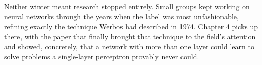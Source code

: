 Neither winter meant research stopped entirely. Small groups kept working on neural networks through the years when the label was most unfashionable, refining exactly the technique Werbos had described in 1974. Chapter 4 picks up there, with the paper that finally brought that technique to the field's attention and showed, concretely, that a network with more than one layer could learn to solve problems a single-layer perceptron provably never could.
